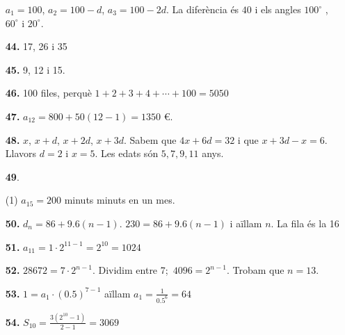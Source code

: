 \documentclass[a4paper, pdf, twoside]{book}
\begin{document}
\begin{multicols}{2}
\begin{enumerate}
$a_1=100$, $a_2=100-d$, $a_3=100-2d$. La diferència és $40$ i els angles $100^\circ$ , $60^\circ$ i $20^\circ$.
\vspace{0.25cm}
\item[\fontfamily{phv}\selectfont\color{blue}\textbf{44. }] 
17, 26 i 35
\vspace{0.25cm}
\item[\fontfamily{phv}\selectfont\color{blue}\textbf{45. }] 
9, 12 i 15.
\vspace{0.25cm}
\item[\fontfamily{phv}\selectfont\color{blue}\textbf{46. }] 
100 files, perquè $1+2+3+4+\cdots +100=5050$
\vspace{0.25cm}
\item[\fontfamily{phv}\selectfont\color{blue}\textbf{47. }] 
$a_{12}=800+50 (12-1)=1350$ \euro {}.
\vspace{0.25cm}
\item[\fontfamily{phv}\selectfont\color{blue}\textbf{48. }] 
$x$, $x+d$, $x+2d$, $x+3d$. Sabem que $4x+6d=32$ i que $x+3d-x=6$. Llavors $d=2$ i $x=5$. Les edats són $5, 7, 9, 11$ anys.
\vspace{0.25cm}



 \item[\fontfamily{phv}\selectfont\color{blue}\textbf{49}. ] 
 \begin{tasks}[column-sep=1em, item-indent=1.3333em](1)
	 \task $a_{15} = 200$ minuts
	  minuts en un mes.
\end{tasks}
\vspace{0.25cm}
\item[\fontfamily{phv}\selectfont\color{blue}\textbf{50. }] 
$d_n=86+9.6(n-1)$. $230=86+9.6(n-1)$ i aïllam $n$. La fila és la 16
\vspace{0.25cm}
\item[\fontfamily{phv}\selectfont\color{blue}\textbf{51. }] 
$a_{11}=1\cdot 2^{11-1}=2^{10}=1024$
\vspace{0.25cm}
\item[\fontfamily{phv}\selectfont\color{blue}\textbf{52. }] 
$28672=7\cdot 2^{n-1}$. Dividim entre 7;\, $4096=2^{n-1}$. Trobam que $n=13$.
\vspace{0.25cm}
\item[\fontfamily{phv}\selectfont\color{blue}\textbf{53. }] 
$1=a_1 \cdot (0.5)^{7-1}$ aïllam $a_1 = \frac {1}{0.5^6}=64$
\vspace{0.25cm}
\item[\fontfamily{phv}\selectfont\color{blue}\textbf{54. }] 
$S_{10}=\frac {3 (2^{10}-1)}{2-1}=3069$
 \end{enumerate}
\vspace{0.3cm}


\end{multicols}
\end{document}
